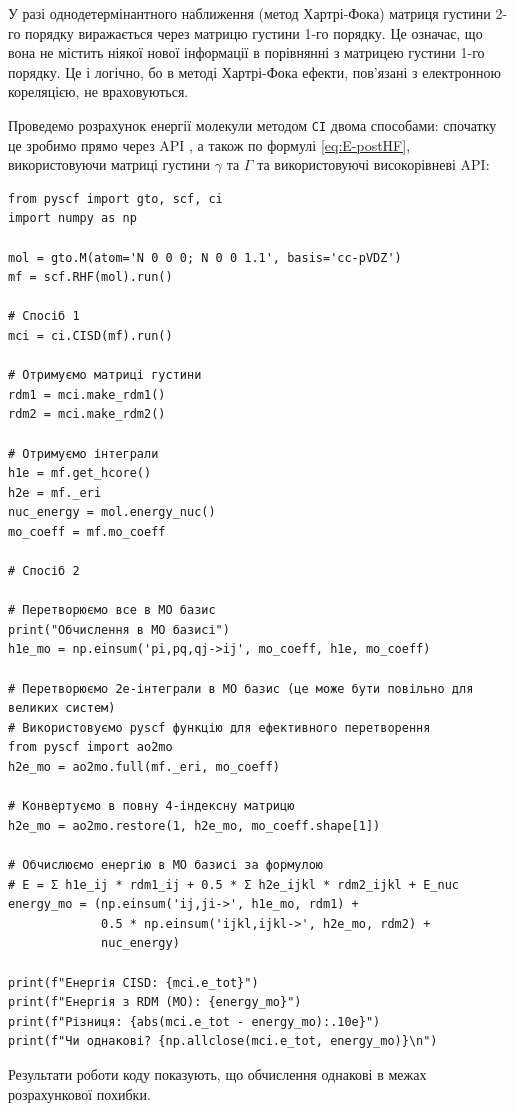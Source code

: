 \begin{commentbox}
	У разі однодетермінантного наближення (метод Хартрі-Фока) матриця густини 2-го порядку виражається
	через матрицю густини 1-го порядку. Це означає, що вона не містить ніякої нової інформації в порівнянні з
	матрицею густини 1-го порядку. Це і логічно, бо в методі Хартрі-Фока ефекти, пов'язані з електронною кореляцією, не
	враховуються.
\end{commentbox}

Проведемо розрахунок енергії молекули  методом \texttt{CI} двома способами: спочатку це зробимо прямо через API \PySCF, а також по формулі \eqref{eq:E-postHF}, використовуючи матриці густини $\gamma$ та $\Gamma$ та використовуючі високорівневі API:
\begin{verbatim}
from pyscf import gto, scf, ci
import numpy as np

mol = gto.M(atom='N 0 0 0; N 0 0 1.1', basis='cc-pVDZ')
mf = scf.RHF(mol).run()

# Спосіб 1
mci = ci.CISD(mf).run()

# Отримуємо матриці густини
rdm1 = mci.make_rdm1()
rdm2 = mci.make_rdm2()

# Отримуємо інтеграли
h1e = mf.get_hcore()
h2e = mf._eri
nuc_energy = mol.energy_nuc()
mo_coeff = mf.mo_coeff

# Спосіб 2

# Перетворюємо все в MO базис
print("Обчислення в MO базисі")
h1e_mo = np.einsum('pi,pq,qj->ij', mo_coeff, h1e, mo_coeff)

# Перетворюємо 2e-інтеграли в MO базис (це може бути повільно для великих систем)
# Використовуємо pyscf функцію для ефективного перетворення
from pyscf import ao2mo
h2e_mo = ao2mo.full(mf._eri, mo_coeff)

# Конвертуємо в повну 4-індексну матрицю
h2e_mo = ao2mo.restore(1, h2e_mo, mo_coeff.shape[1])

# Обчислюємо енергію в MO базисі за формулою
# E = Σ h1e_ij * rdm1_ij + 0.5 * Σ h2e_ijkl * rdm2_ijkl + E_nuc
energy_mo = (np.einsum('ij,ji->', h1e_mo, rdm1) +
             0.5 * np.einsum('ijkl,ijkl->', h2e_mo, rdm2) +
             nuc_energy)

print(f"Енергія CISD: {mci.e_tot}")
print(f"Енергія з RDM (MO): {energy_mo}")
print(f"Різниця: {abs(mci.e_tot - energy_mo):.10e}")
print(f"Чи однакові? {np.allclose(mci.e_tot, energy_mo)}\n")
\end{verbatim}
Результати роботи коду показують, що обчислення однакові в межах розрахункової похибки.


